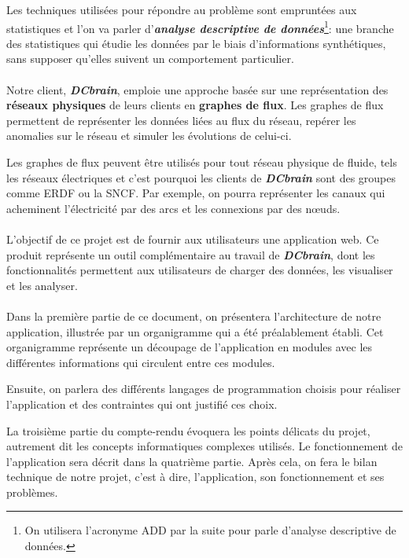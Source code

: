 	Les techniques utilisées pour répondre au problème sont empruntées aux statistiques et l'on va parler d'\textit{\textbf{analyse descriptive de données}}\footnote{On utilisera l'acronyme ADD par la suite pour parle d'analyse descriptive de données.}: une branche des statistiques qui étudie les données par le biais d'informations synthétiques, sans supposer qu'elles suivent un comportement particulier.
	\paragraph{}Notre client, \textit{\textbf{DCbrain}}, emploie une approche basée sur une représentation des \textbf{réseaux physiques} de leurs clients en \textbf{graphes de flux}. Les graphes de flux permettent de représenter les données liées au flux du réseau, repérer les anomalies sur le réseau et simuler les évolutions de celui-ci.
	
	Les graphes de flux peuvent être utilisés pour tout réseau physique de fluide, tels les réseaux électriques et c’est pourquoi les clients de \textit{\textbf{DCbrain}} sont des groupes comme ERDF ou la SNCF. Par exemple, on pourra représenter les canaux qui acheminent l'électricité par des arcs et les connexions par des nœuds.
	\paragraph{}L'objectif de ce projet est de fournir aux utilisateurs une application web. Ce produit représente un outil complémentaire au travail de \textit{\textbf{DCbrain}}, dont les fonctionnalités permettent aux utilisateurs de charger des données, les visualiser et les analyser. 

	\paragraph{}Dans la première partie de ce document, on présentera l'architecture de notre application, illustrée par un organigramme qui a été préalablement établi. Cet organigramme représente un découpage de l'application en modules avec les différentes informations qui circulent entre ces modules.
	
	Ensuite, on parlera des différents langages de programmation choisis pour réaliser l'application et des contraintes qui ont justifié ces choix.
	
	La troisième partie du compte-rendu évoquera les points délicats du projet, autrement dit les concepts informatiques complexes utilisés.
	Le fonctionnement de l'application sera décrit dans la quatrième partie.
	Après cela, on fera le bilan technique de notre projet, c'est à dire, l'application, son fonctionnement et ses problèmes.
	

